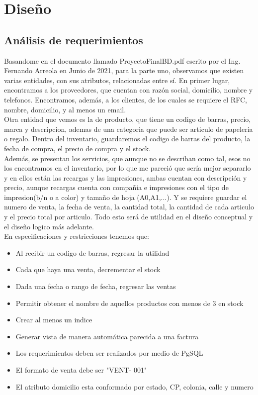 \documentclass[letter,12pt]{article}
\begin{document}
\newpage
\section{Diseño}
\subsection{Análisis de requerimientos}
Basandome en el documento llamado ProyectoFinalBD.pdf escrito por el Ing. Fernando Arreola en Junio de 2021, para la parte uno, observamos que existen varias entidades, con sus atributos, relacionadas entre sí. En primer lugar, encontramos a los proveedores, que cuentan con razón social, domicilio, nombre y telefonos. Encontramos, además, a los clientes, de los cuales se requiere el RFC, nombre, domicilio, y al menos un email. \\
Otra entidad que vemos es la de producto, que tiene un codigo de barras, precio, marca y descripcion, ademas de una categoria que puede ser articulo de papeleria o regalo. Dentro del inventario, guardaremos el codigo de barras del producto, la fecha de compra, el precio de compra y el stock.\\
Además, se presentan los servicios, que aunque no se describan como tal, esos no los encontramos en el inventario, por lo que me pareció que sería mejor separarlo y en ellos están las recargas y las impresiones, ambas cuentan con descripción y precio, aunque recargas cuenta con compañia e impresiones con el tipo de impresion(b/n o a color) y tamaño de hoja (A0,A1,...). Y se requiere guardar el numero de venta, la fecha de venta, la cantidad total, la cantidad de cada articulo y el precio total por articulo. Todo esto será de utilidad en el diseño conceptual y el diseño logico más adelante.\\
En especificaciones y restricciones tenemos que:
\begin{itemize}
\item Al recibir un codigo de barras, regresar la utilidad
\item Cada que haya una venta, decrementar el stock
\item Dada una fecha o rango de fecha, regresar las ventas
\item Permitir obtener el nombre de aquellos productos con menos de 3 en stock
\item Crear al menos un indice
\item Generar vista de manera automática parecida a una factura
\item Los requerimientos deben ser realizados por medio de PgSQL
\item El formato de venta debe ser "VENT- 001"
\item El atributo domicilio esta conformado por estado, CP, colonia, calle y numero
\end{itemize}
\end{document}
